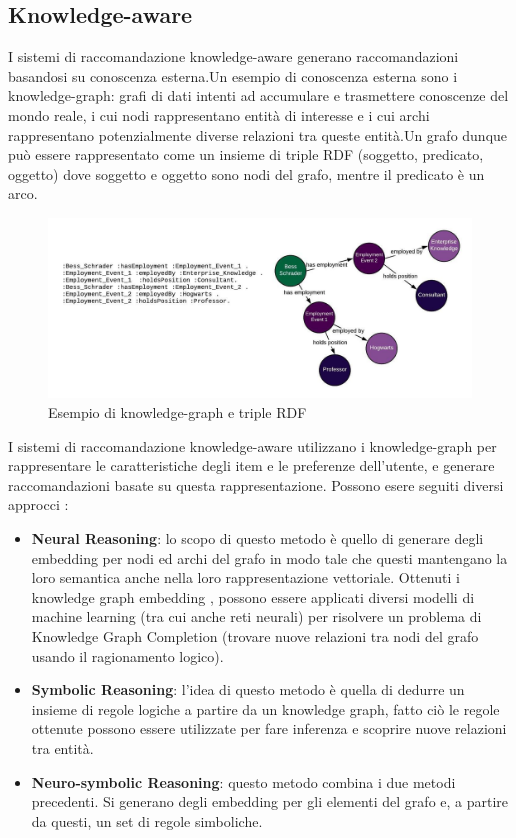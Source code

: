 \subsection{Knowledge-aware}
I sistemi di raccomandazione knowledge-aware generano raccomandazioni basandosi su conoscenza esterna\cite{KnowledgeAware}.Un esempio di conoscenza esterna sono i knowledge-graph: grafi di dati intenti ad accumulare e trasmettere conoscenze del mondo reale, i cui nodi rappresentano entità di interesse e i cui archi rappresentano potenzialmente diverse relazioni tra queste entità\cite{KnowledgeGraph}.Un grafo dunque può essere rappresentato come un insieme di triple RDF (soggetto, predicato, oggetto) dove soggetto e oggetto sono nodi del grafo, mentre il predicato è un arco.
\begin{figure}[H]
    \centering
    \includegraphics[scale=0.5]{images/graph.png}
    \caption{Esempio di knowledge-graph e triple RDF}
\end{figure} 
\noindent I sistemi di raccomandazione knowledge-aware utilizzano i knowledge-graph per rappresentare le caratteristiche degli item e le preferenze dell'utente, e generare raccomandazioni basate su questa rappresentazione. Possono esere seguiti diversi approcci  \cite{NeuroSimb}:
\begin{itemize}
    \item \textbf{Neural Reasoning}: lo scopo di questo metodo è quello di generare degli embedding per nodi ed archi del grafo in modo tale che questi mantengano la loro semantica anche nella loro rappresentazione vettoriale. Ottenuti i knowledge graph embedding \cite{KGEmbedd}, possono essere applicati diversi modelli di machine learning (tra cui anche reti neurali) per risolvere un problema di Knowledge Graph Completion (trovare nuove relazioni tra nodi del grafo usando il ragionamento logico).
    \item \textbf{Symbolic Reasoning}: l’idea di questo metodo è quella di dedurre un insieme di regole logiche a partire da un knowledge graph, fatto ciò le regole ottenute possono essere utilizzate per fare inferenza e scoprire nuove relazioni tra entità.
    \item \textbf{Neuro-symbolic Reasoning}: questo metodo combina i due metodi precedenti. Si generano degli embedding per gli elementi del grafo e, a partire da questi, un set di regole simboliche.
\end{itemize}

